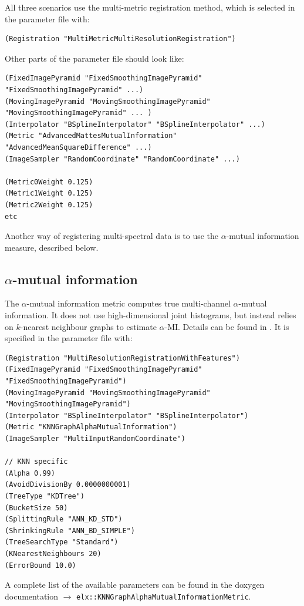 \documentclass[]{report}
\begin{document}
All three scenarios use the multi-metric registration method, which
is selected in the parameter file with:
\small
\begin{verbatim}
(Registration "MultiMetricMultiResolutionRegistration")
\end{verbatim}
\normalsize Other parts of the parameter file should look like:
\small
\begin{verbatim}
(FixedImagePyramid "FixedSmoothingImagePyramid" "FixedSmoothingImagePyramid" ...)
(MovingImagePyramid "MovingSmoothingImagePyramid" "MovingSmoothingImagePyramid" ... )
(Interpolator "BSplineInterpolator" "BSplineInterpolator" ...)
(Metric "AdvancedMattesMutualInformation" "AdvancedMeanSquareDifference" ...)
(ImageSampler "RandomCoordinate" "RandomCoordinate" ...)

(Metric0Weight 0.125)
(Metric1Weight 0.125)
(Metric2Weight 0.125)
etc
\end{verbatim}
\normalsize

Another way of registering multi-spectral data is to use the
$\alpha$-mutual information measure, described below.

\subsection{$\alpha$-mutual information}

The $\alpha$-mutual information metric computes true multi-channel
$\alpha$-mutual information. It does not use high-dimensional joint
histograms, but instead relies on $k$-nearest neighbour graphs to
estimate $\alpha$-MI. Details can be found in \cite{Staring09}. It
is specified in the parameter file with: \small
\begin{verbatim}
(Registration "MultiResolutionRegistrationWithFeatures")
(FixedImagePyramid "FixedSmoothingImagePyramid" "FixedSmoothingImagePyramid")
(MovingImagePyramid "MovingSmoothingImagePyramid" "MovingSmoothingImagePyramid")
(Interpolator "BSplineInterpolator" "BSplineInterpolator")
(Metric "KNNGraphAlphaMutualInformation")
(ImageSampler "MultiInputRandomCoordinate")

// KNN specific
(Alpha 0.99)
(AvoidDivisionBy 0.0000000001)
(TreeType "KDTree")
(BucketSize 50)
(SplittingRule "ANN_KD_STD")
(ShrinkingRule "ANN_BD_SIMPLE")
(TreeSearchType "Standard")
(KNearestNeighbours 20)
(ErrorBound 10.0)
\end{verbatim}
\normalsize A complete list of the available parameters can be found in the
doxygen documentation $\rightarrow$ \linebreak
\texttt{elx::KNNGraphAlphaMutualInformationMetric}.
\end{document}
